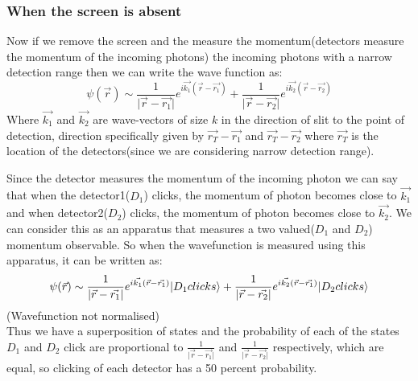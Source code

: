     \subsubsection{When the screen is absent}
    Now if we remove the screen and the measure the momentum(detectors measure the momentum of the incoming photons) the incoming photons with a narrow detection range then we can write the wave function as:
    \begin{equation}
        \psi(\Vec{r}) \sim \frac{1}{\lvert \Vec{r} - \Vec{r_1} \rvert}e^{i\Vec{k_1}(\Vec{r} - \Vec{r_1})} + \frac{1}{\lvert \Vec{r} - \Vec{r_2} \rvert}e^{i\Vec{k_2}(\Vec{r} - \Vec{r_2})}
    \end{equation}
    Where $\Vec{k_1}$ and $\Vec{k_2}$ are wave-vectors of size $k$ in the direction of slit to the point of detection, direction specifically given by $\Vec{r_T} - \Vec{r_1}$ and $\Vec{r_T} - \Vec{r_2}$ where $\Vec{r_T}$ is the location of the detectors(since we are considering narrow detection range).\\
    \par Since the detector measures the momentum of the incoming photon we can say that when the detector1($D_1$) clicks, the momentum of photon becomes close to $\Vec{k_1}$ and when detector2($D_2$) clicks, the momentum of photon becomes close to $\Vec{k_2}$. We can consider this as an apparatus that measures a two valued($D_1$ and $D_2$) momentum observable. So when the wavefunction is measured using this apparatus, it can be written as:
    \begin{equation}
        \psi(\Vec{r}) \sim \frac{1}{\lvert \Vec{r} - \Vec{r_1} \rvert}e^{i\Vec{k_1}(\Vec{r} - \Vec{r_1})} \lvert D_1 clicks\rangle + \frac{1}{\lvert \Vec{r} - \Vec{r_2} \rvert}e^{i\Vec{k_2}(\Vec{r} - \Vec{r_1})} \lvert D_2 clicks\rangle
    \end{equation}
    (Wavefunction not normalised) \\
    Thus we have a superposition of states and the probability of each of the states $D_1$ and $D_2$ click are proportional to $\frac{1}{\lvert \Vec{r} - \Vec{r_1} \rvert}$ and $\frac{1}{\lvert \Vec{r} - \Vec{r_2} \rvert}$ respectively, which are equal, so clicking of each detector has a 50 percent probability.
